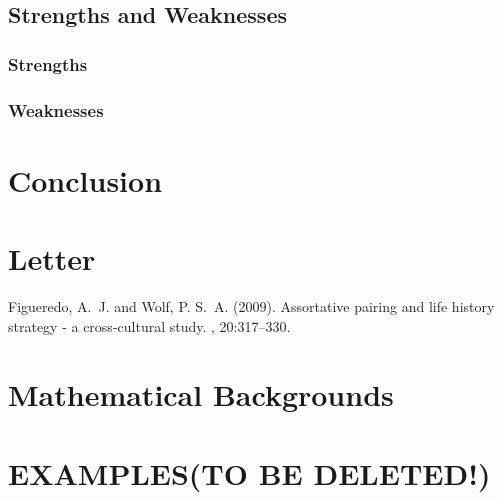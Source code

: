 \documentclass[12pt]{article} %
\begin{document}
\subsection{Strengths and Weaknesses}
\subsubsection{Strengths}
\subsubsection{Weaknesses}

\section{Conclusion} %

\newpage
\section{Letter}


\newpage
\begin{thebibliography}{99} %

Figueredo, A.~J. and Wolf, P. S.~A. (2009).
\newblock Assortative pairing and life history strategy - a cross-cultural
  study.
, 20:317--330.
 
\end{thebibliography}

\newpage
\appendix
\appendixpage
\section{Mathematical Backgrounds}
\newpage
\section{EXAMPLES(TO BE DELETED!)}

\end{document}
